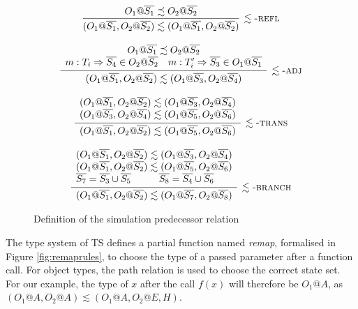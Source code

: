 \documentclass[preprint]{sigplanconf}
\makeatletter
\newcommand{\figref}[1]{Figure \ref{#1}}
\newcommand{\ot}[2]{#1@\overline{#2}}
\makeatother
\begin{document}
\begin{figure}

\[
\begin{array}{c}

\infer[\lesssim\textsc{-refl}]
  {(O_1@\overline{S_1}, O_2@\overline{S_2}) \lesssim (O_1@\overline{S_1}, O_2@\overline{S_2})}
  {O_1@\overline{S_1} \precsim O_2@\overline{S_2}}
\\\\
\infer[\lesssim\textsc{-adj}]
  {(O_1@\overline{S_1}, O_2@\overline{S_2}) \lesssim (O_1@\overline{S_3}, O_2@\overline{S_4})}
  {
    \begin{array}{cc}
    \multicolumn{2}{c}{O_1@\overline{S_1} \precsim O_2@\overline{S_2}}
    \\
    m : T_i \Rightarrow \overline{S_4} \in O_2@\overline{S_2}
    &
    m : T_i' \Rightarrow \overline{S_3} \in O_1@\overline{S_1}
    \end{array}
  }

\\\\
\infer[\lesssim\textsc{-trans}]
  {
  (O_1@\overline{S_1}, O_2@\overline{S_2}) \lesssim (O_1@\overline{S_5}, O_2@\overline{S_6})
  }
  {
  \begin{array}{c}
  (O_1@\overline{S_1}, O_2@\overline{S_2}) \lesssim (O_1@\overline{S_3}, O_2@\overline{S_4})
  \\
  (O_1@\overline{S_3}, O_2@\overline{S_4}) \lesssim (O_1@\overline{S_5}, O_2@\overline{S_6})
  \end{array}
  }
\\\\
\infer[\lesssim\textsc{-branch}]
	{
	(\ot{O_1}{S_1}, \ot{O_2}{S_2}) \lesssim (\ot{O_1}{S_7}, \ot{O_2}{S_8})
	}
	{
	\begin{array}{cc}
	\multicolumn{2}{c}{
	(\ot{O_1}{S_1}, \ot{O_2}{S_2}) \lesssim (\ot{O_1}{S_3}, \ot{O_2}{S_4})
	}
	\\
	\multicolumn{2}{c}{
	(\ot{O_1}{S_1}, \ot{O_2}{S_2}) \lesssim (\ot{O_1}{S_5}, \ot{O_2}{S_6})
	}
	\\
	\overline{S_7} = \overline{S_3} \cup \overline{S_5}
	&
	\overline{S_8} = \overline{S_4} \cup \overline{S_6}
	\end{array}
	}
	
\end{array}
\]
\caption{\label{fig:simreach} Definition of the simulation predecessor relation}
\end{figure}

The type system of TS defines a partial function named {\it remap}, 
formalised in \figref{fig:remaprules}, to choose the type of a passed parameter
after a function call. For object types, the path relation is used to choose
the correct state set. For our example, the type of $x$ after the call
$f(x)$ will therefore be $O_1@A$, as
$(O_1@A, O_2@A) \lesssim (O_1@A, O_2@{E,H})$.
\end{document}
